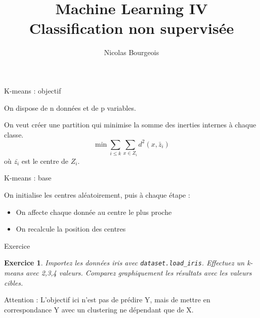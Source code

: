 \documentclass[11pt]{beamer}
\title{Machine Learning IV \\ Classification non supervisée}
\author{Nicolas Bourgeois}
\date{}
\newtheorem{exercice}{Exercice}
\begin{document}
\begin{frame}
\maketitle
\end{frame}

\begin{frame}{K-means : objectif}

On dispose de n données et de p variables.\\

\pause
\vspace{0.2cm}

On veut créer une partition qui minimise la somme des inerties internes à chaque classe.\\

$$\min \sum_{i \leq k} \sum_{x \in Z_i} d^2(x,\bar{z}_i)$$
où $\bar{z_i}$ est le centre de $Z_i$.

\end{frame}

\begin{frame}{K-means : base}

On initialise les centres aléatoirement, puis à chaque étape :
\pause
\begin{itemize}
	\item On affecte chaque donnée au centre le plus proche
	\item On recalcule la position des centres
\end{itemize}

\end{frame}


\begin{frame}{Exercice}

\begin{exercice}
Importez les données iris avec \texttt{dataset.load\_iris}. Effectuez un k-means avec 2,3,4 valeurs. Comparez graphiquement les résultats avec les valeurs cibles.
\end{exercice}

Attention : L'objectif ici n'est pas de prédire Y, mais de mettre en correspondance Y avec un clustering ne dépendant que de X.

\end{frame}
\end{document}
